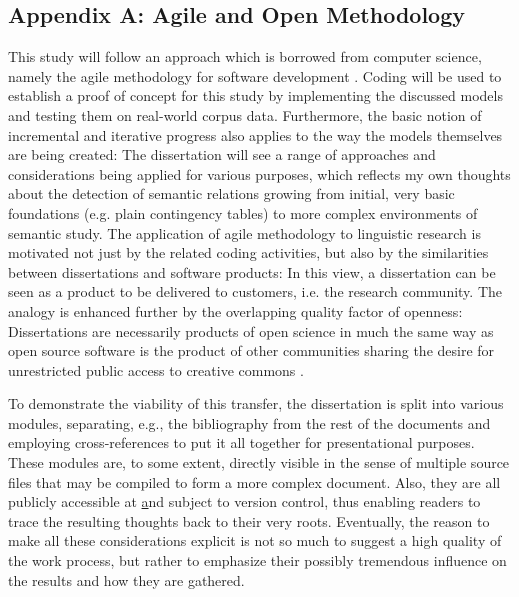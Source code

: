 \documentclass[runningheads]{llncs}
\begin{document}
\subsection{Appendix A: Agile and Open Methodology}
\label{sec:appendixA}
This study will follow an approach which is borrowed from computer science, namely the agile methodology for software development \parencite[32]{fowlerAgileManifesto2001}. Coding will be used to establish a proof of concept for this study by implementing the discussed models and testing them on real-world corpus data. Furthermore, the basic notion of incremental and iterative progress also applies to the way the models themselves are being created: The dissertation will see a range of approaches and considerations being applied for various purposes, which reflects my own thoughts about the detection of semantic relations growing from initial, very basic foundations (e.g. plain contingency tables) to more complex environments of semantic study. The application of agile methodology to linguistic research is motivated not just by the related coding activities, but also by the similarities between dissertations and software products: In this view, a dissertation can be seen as a product to be delivered to customers, i.e. the research community. The analogy is enhanced further by the overlapping quality factor of openness: Dissertations are necessarily products of open science in much the same way as open source software is the product of other communities sharing the desire for unrestricted public access to creative commons \parencite[518]{garcia-penalvoOpenKnowledgeManagement2010}. 

To demonstrate the viability of this transfer, the dissertation is split into various modules, separating, e.g., the bibliography from the rest of the documents and employing cross-references to put it all together for presentational purposes. These modules are, to some extent, directly visible in the sense of multiple source files that may be compiled to form a more complex document. Also, they are all publicly accessible at \href{https://github.com/konstantinschulz/asrael} and subject to version control, thus enabling readers to trace the resulting thoughts back to their very roots. Eventually, the reason to make all these considerations explicit is not so much to suggest a high quality of the work process, but rather to emphasize their possibly tremendous influence on the results and how they are gathered.

\printbibliography[heading=bibintoc]
\end{document}

